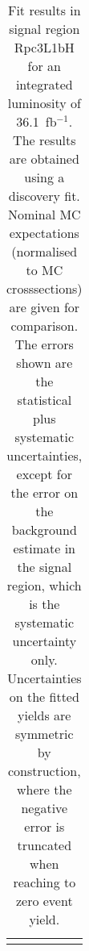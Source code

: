 \begin{table}
\begin{center}
{\begin{tabular*}{\textwidth}{@{\extracolsep{\fill}}lr}
\noalign{\smallskip}\hline\noalign{\smallskip}
\end{tabular*}
}
\end{center}
\caption{Fit results in signal region Rpc3L1bH for an integrated luminosity of 36.1~fb$^{-1}$.
The results are obtained using a discovery fit. Nominal MC expectations (normalised to MC crosssections) are given for comparison.
The errors shown are the statistical plus systematic uncertainties, except for the error on the background estimate in the signal region, which is the systematic uncertainty only.
Uncertainties on the fitted yields are symmetric by construction, where the negative error is truncated when reaching to zero event yield.
}
\label{table.results.systematics.in.logL.fit..Yields.Rpc3L1bH}
\end{table}
\clearpage
%